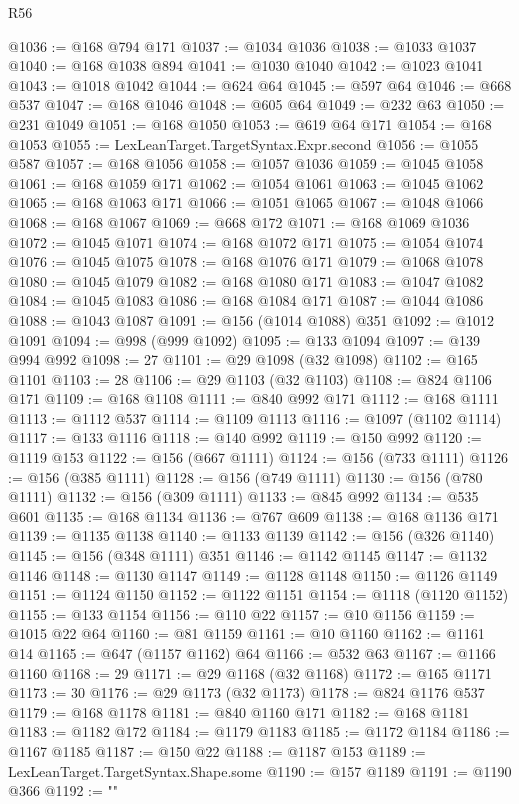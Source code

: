 \begin{lexlean}{R56}
\begin{coremodule}
@1036 := @168 @794 @171
@1037 := @1034 @1036
@1038 := @1033 @1037
@1040 := @168 @1038 @894
@1041 := @1030 @1040
@1042 := @1023 @1041
@1043 := @1018 @1042
@1044 := @624 @64
@1045 := @597 @64
@1046 := @668 @537
@1047 := @168 @1046
@1048 := @605 @64
@1049 := @232 @63
@1050 := @231 @1049
@1051 := @168 @1050
@1053 := @619 @64 @171
@1054 := @168 @1053
@1055 := LexLeanTarget.TargetSyntax.Expr.second
@1056 := @1055 @587
@1057 := @168 @1056
@1058 := @1057 @1036
@1059 := @1045 @1058
@1061 := @168 @1059 @171
@1062 := @1054 @1061
@1063 := @1045 @1062
@1065 := @168 @1063 @171
@1066 := @1051 @1065
@1067 := @1048 @1066
@1068 := @168 @1067
@1069 := @668 @172
@1071 := @168 @1069 @1036
@1072 := @1045 @1071
@1074 := @168 @1072 @171
@1075 := @1054 @1074
@1076 := @1045 @1075
@1078 := @168 @1076 @171
@1079 := @1068 @1078
@1080 := @1045 @1079
@1082 := @168 @1080 @171
@1083 := @1047 @1082
@1084 := @1045 @1083
@1086 := @168 @1084 @171
@1087 := @1044 @1086
@1088 := @1043 @1087
@1091 := @156 (@1014 @1088) @351
@1092 := @1012 @1091
@1094 := @998 (@999 @1092)
@1095 := @133 @1094
@1097 := @139 @994 @992
@1098 := 27
@1101 := @29 @1098 (@32 @1098)
@1102 := @165 @1101
@1103 := 28
@1106 := @29 @1103 (@32 @1103)
@1108 := @824 @1106 @171
@1109 := @168 @1108
@1111 := @840 @992 @171
@1112 := @168 @1111
@1113 := @1112 @537
@1114 := @1109 @1113
@1116 := @1097 (@1102 @1114)
@1117 := @133 @1116
@1118 := @140 @992
@1119 := @150 @992
@1120 := @1119 @153
@1122 := @156 (@667 @1111)
@1124 := @156 (@733 @1111)
@1126 := @156 (@385 @1111)
@1128 := @156 (@749 @1111)
@1130 := @156 (@780 @1111)
@1132 := @156 (@309 @1111)
@1133 := @845 @992
@1134 := @535 @601
@1135 := @168 @1134
@1136 := @767 @609
@1138 := @168 @1136 @171
@1139 := @1135 @1138
@1140 := @1133 @1139
@1142 := @156 (@326 @1140)
@1145 := @156 (@348 @1111) @351
@1146 := @1142 @1145
@1147 := @1132 @1146
@1148 := @1130 @1147
@1149 := @1128 @1148
@1150 := @1126 @1149
@1151 := @1124 @1150
@1152 := @1122 @1151
@1154 := @1118 (@1120 @1152)
@1155 := @133 @1154
@1156 := @110 @22
@1157 := @10 @1156
@1159 := @1015 @22 @64
@1160 := @81 @1159
@1161 := @10 @1160
@1162 := @1161 @14
@1165 := @647 (@1157 @1162) @64
@1166 := @532 @63
@1167 := @1166 @1160
@1168 := 29
@1171 := @29 @1168 (@32 @1168)
@1172 := @165 @1171
@1173 := 30
@1176 := @29 @1173 (@32 @1173)
@1178 := @824 @1176 @537
@1179 := @168 @1178
@1181 := @840 @1160 @171
@1182 := @168 @1181
@1183 := @1182 @172
@1184 := @1179 @1183
@1185 := @1172 @1184
@1186 := @1167 @1185
@1187 := @150 @22
@1188 := @1187 @153
@1189 := LexLeanTarget.TargetSyntax.Shape.some
@1190 := @157 @1189
@1191 := @1190 @366
@1192 := "{"
}
\end{coremodule}
\end{lexlean}
